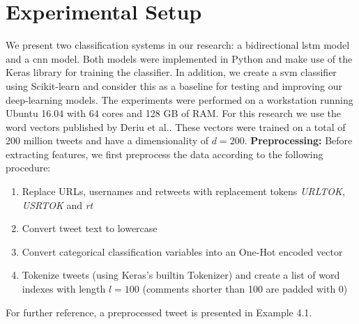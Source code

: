 \documentclass[11pt]{article}
\begin{document}
\section{Experimental Setup}
We present two classification systems in our research: a bidirectional \ac{lstm} model and a \ac{cnn} model. Both models were implemented in Python and make use of the Keras library \cite{RN64} for training the classifier. In addition, we create a \ac{svm} classifier using Scikit-learn \cite{scikit-learn} and consider this as a baseline for testing and improving our deep-learning models. The experiments were performed on a workstation running Ubuntu 16.04 with 64 cores and 128 GB of RAM.
\newline
For this research we use the word vectors published by Deriu et al.. These vectors were trained on a total of 200 million tweets and have a dimensionality of $d=200$.
\newline
\textbf{Preprocessing: }
Before extracting features, we first preprocess the data according to the following procedure:
\begin{enumerate}[topsep=1.5pt,itemsep=-1ex,partopsep=1ex,parsep=1ex] 
  \item Replace URLs, usernames and retweets with replacement tokens \textit{URLTOK}, \textit{USRTOK} and \textit{rt}
  \item Convert tweet text to lowercase
  \item Convert categorical classification variables into an One-Hot encoded vector
  \item Tokenize tweets (using Keras's builtin Tokenizer) and create a list of word indexes with length $l=100$ (comments shorter than 100 are padded with 0)
\end{enumerate}
For further reference, a preprocessed tweet is presented in Example 4.1.
\newline
\noindent{}
\end{document}
